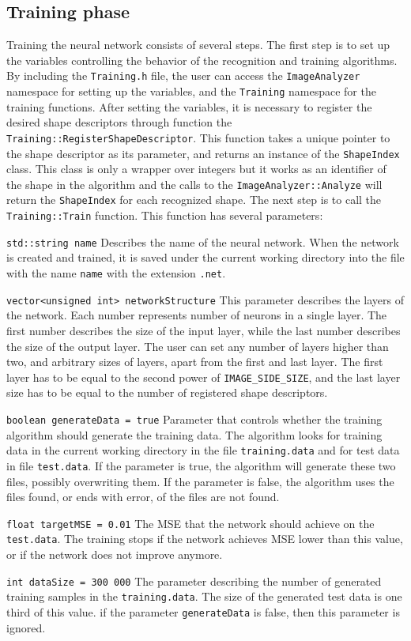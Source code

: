\subsection{Training phase}
Training the neural network consists of several steps. The first step is to set up the variables controlling the behavior of the recognition and training algorithms. By including the \texttt{Training.h} file, the user can access the \texttt{ImageAnalyzer} namespace for setting up the variables, and the \texttt{Training} namespace for the training functions. 
After setting the variables, it is necessary to register the desired shape descriptors through function the \texttt{Training::RegisterShapeDescriptor}. This function takes a unique pointer to the shape descriptor as its parameter, and returns an instance of the \texttt{ShapeIndex} class. This class is only a wrapper over integers but it works as an identifier of the shape in the algorithm and the calls to the \texttt{ImageAnalyzer::Analyze} will return the \texttt{ShapeIndex} for each recognized shape. 
The next step is to call the \texttt{Training::Train} function. This function has several parameters:
\begin{description}
\item \texttt{std::string name} Describes the name of the neural network. When the network is created and trained, it is saved under the current working directory into the file with the name \texttt{name} with the extension \texttt{.net}.
\item \texttt{vector<unsigned int> networkStructure} This parameter describes the layers of the network. Each number represents number of neurons in a single layer. The first number describes the size of the input layer, while the last number describes the size of the output layer. The user can set any number of layers higher than two, and arbitrary sizes of layers, apart from the first and last layer.  The first layer has to be equal to the second power of \texttt{IMAGE\_SIDE\_SIZE}, and the last layer size has to be equal to the number of registered shape descriptors.
\item \texttt{boolean generateData = true} Parameter that controls whether the training algorithm should generate the training data. The algorithm looks for training data in the current working directory in the file \texttt{training.data} and for test data in file \texttt{test.data}. If the parameter is true, the algorithm will generate these two files, possibly overwriting them. If the parameter is false, the algorithm uses the files found, or ends with error, of the files are not found.
\item \texttt{float targetMSE = 0.01} The MSE that the network should achieve on the \texttt{test.data}. The training stops if the network achieves MSE lower than this value, or if the network does not improve anymore. 
\item \texttt{int dataSize = 300 000} The parameter describing the number of generated training samples in the \texttt{training.data}. The size of the generated test data is one third of this value. if the parameter \texttt{generateData} is false, then this parameter is ignored. 
\end{description}
